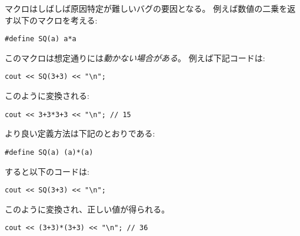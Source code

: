 \begin{comment}
Sometimes macros cause bugs that may be difficult
to detect. For example, consider the following macro
that calculates the square of a number:
\begin{lstlisting}
#define SQ(a) a*a
\end{lstlisting}
This macro \emph{does not} always work as expected.
For example, the code
\begin{lstlisting}
cout << SQ(3+3) << "\n";
\end{lstlisting}
corresponds to the code
\begin{lstlisting}
cout << 3+3*3+3 << "\n"; // 15
\end{lstlisting}
\end{comment}

マクロはしばしば原因特定が難しいバグの要因となる。
例えば数値の二乗を返す以下のマクロを考える:
\begin{lstlisting}
#define SQ(a) a*a
\end{lstlisting}
このマクロは想定通りには\emph{動かない場合がある}。
例えば下記コードは:
\begin{lstlisting}
cout << SQ(3+3) << "\n";
\end{lstlisting}
このように変換される:
\begin{lstlisting}
cout << 3+3*3+3 << "\n"; // 15
\end{lstlisting}

\begin{comment}
A better version of the macro is as follows:
\begin{lstlisting}
#define SQ(a) (a)*(a)
\end{lstlisting}
Now the code
\begin{lstlisting}
cout << SQ(3+3) << "\n";
\end{lstlisting}
corresponds to the code
\begin{lstlisting}
cout << (3+3)*(3+3) << "\n"; // 36
\end{lstlisting}
\end{comment}

より良い定義方法は下記のとおりである:
\begin{lstlisting}
#define SQ(a) (a)*(a)
\end{lstlisting}
すると以下のコードは:
\begin{lstlisting}
cout << SQ(3+3) << "\n";
\end{lstlisting}
このように変換され、正しい値が得られる。
\begin{lstlisting}
cout << (3+3)*(3+3) << "\n"; // 36
\end{lstlisting}

